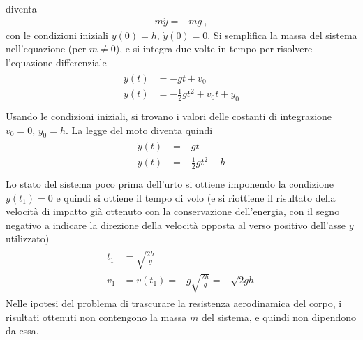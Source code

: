 \documentclass[letterpaper,10pt,italian]{jupyterBook}
\begin{document}
\sphinxAtStartPar
diventa
\begin{equation*}
\begin{split}m \ddot{y} = - m g \ , \end{split}
\end{equation*}
\sphinxAtStartPar
con le condizioni iniziali \(y(0) = h\), \(\dot{y}(0) = 0\). Si semplifica la massa del sistema nell’equazione (per \(m \ne 0\)), e si integra due volte in tempo per risolvere l’equazione differenziale
\begin{equation*}
\begin{split}\begin{aligned}
  \dot{y}(t) & = - g t + v_0 \\
       y (t) & = - \frac{1}{2} g t^2 + v_0 t + y_0 \\
\end{aligned}\end{split}
\end{equation*}
\sphinxAtStartPar
Usando le condizioni iniziali, si trovano i valori delle costanti di integrazione \(v_0 = 0\), \(y_0 = h\). La legge del moto diventa quindi
\begin{equation*}
\begin{split}\begin{aligned}
  \dot{y}(t) & = - g t  \\
       y (t) & = - \frac{1}{2} g t^2 + h \\
\end{aligned}\end{split}
\end{equation*}
\sphinxAtStartPar
Lo stato del sistema poco prima dell’urto si ottiene imponendo la condizione \(y(t_1) = 0\) e quindi si ottiene il tempo di volo (e si ri\sphinxhyphen{}ottiene il risultato della velocità di impatto già ottenuto con la conservazione dell’energia, con il segno negativo a indicare la direzione della velocità opposta al verso positivo dell’asse \(y\) utilizzato)
\begin{equation*}
\begin{split}\begin{aligned}
  t_1 & = \sqrt{\frac{2 h}{g}} \\
  v_1 & = v(t_1) = - g \sqrt{\frac{2 h}{g}} = - \sqrt{2 g h}
\end{aligned}\end{split}
\end{equation*}
\sphinxAtStartPar
{} Nelle ipotesi del problema di trascurare la resistenza aerodinamica del corpo, i risultati ottenuti non contengono la massa \(m\) del sistema, e quindi non dipendono da essa.
\end{document}
